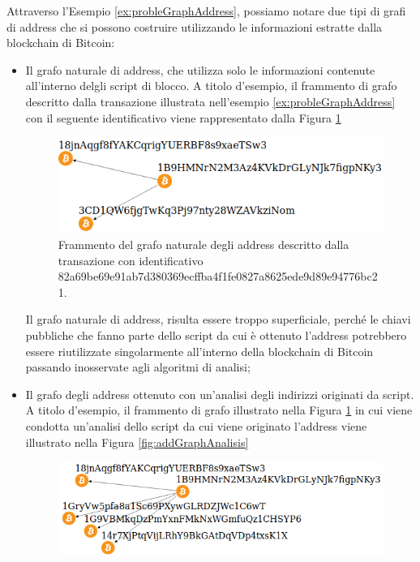  Attraverso l'Esempio \ref{ex:probleGraphAddress}, possiamo notare due tipi di grafi di address che si possono costruire utilizzando le informazioni estratte dalla blockchain di Bitcoin:
 \begin{itemize}
   \item Il grafo naturale di address, che utilizza solo le informazioni contenute all'interno delgli script di blocco. A titolo d'esempio, il frammento di grafo descritto dalla transazione illustrata nell'esempio \ref{ex:probleGraphAddress} con il seguente identificativo  viene rappresentato dalla Figura \ref{fig:addGrapjNatural}
   \begin{figure}[H]
   \centering
   \includegraphics[scale=0.35]{images/exampleWithGraph/naturalAddressGrahScamTx.png}
   \caption{Frammento del grafo naturale degli address descritto dalla transazione con identificativo 82\-a69\-be69e\-91ab7\-d3803\-69ec\-ffba4f\-1fe08\-27a862\-5ede9\-d89e9\-4776b\-c21.\label{fig:addGrapjNatural}}
   \end{figure}
   Il grafo naturale di address, risulta essere troppo superficiale, perché le chiavi pubbliche che fanno parte dello script da cui è ottenuto l'address  potrebbero essere riutilizzate singolarmente all'interno della blockchain di Bitcoin passando inosservate agli algoritmi di analisi;
   \item Il grafo degli address ottenuto con un'analisi degli indirizzi originati da script. A titolo d'esempio, il frammento di grafo illustrato nella Figura \ref{fig:addGrapjNatural} in cui viene condotta un'analisi dello script da cui viene originato l'address  viene illustrato nella Figura \ref{fig:addGraphAnalisis}
   \begin{figure}[H]
   \centering
   \includegraphics[scale=0.35]{images/exampleWithGraph/decode-address-graph-scam.png}

\end{figure}
\end{itemize}
